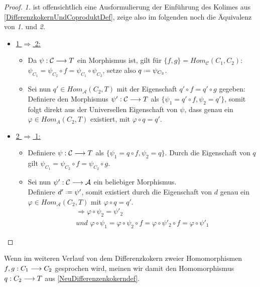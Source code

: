 \documentclass[10pt,a4paper]{report}
\newcommand{\functionfront}[3]{\nolinebreak{#1:#2 \longrightarrow #3}}
\newcommand*{\defeq}{\mathrel{\vcenter{\baselineskip0.5ex \lineskiplimit0pt
                     \hbox{\scriptsize.}\hbox{\scriptsize.}}}%
                     =}
\begin{document}
\begin{proof}
\textit{1.} ist offensichtlich eine Ausformulierung der Einführung des Kolimes aus \cref{DifferenzkokernUndCoproduktDef}, zeige also im folgenden noch die Äquivalenz von \textit{1.} und \textit{2.}
\begin{itemize}
\item \underline{1 $\Rightarrow$ 2:}
\begin{itemize}
\item[] Da $\functionfront{\psi}{\mathcal{C}}{T}$ ein Morphismus ist, gilt für $\lbrace f,g \rbrace = Hom_{\mathcal{C}}(C_1,C_2)$:\\ $\psi_{C_1} = \psi_{C_2} \circ f = \psi_{C_1} \circ \psi_{C_2}$, setze also 
 $q  \defeq \psi_{C_2}$.
\item[] Sei nun $q' \in Hom_{\mathcal{A}}(C_2,T)$ mit der Eigenschaft $q' \circ f = q' \circ g$ gegeben:\\
 Definiere den Morphismus $\functionfront{\psi '}{\mathcal{C}}{T}$ als $\lbrace \psi_1 = q' \circ f , \psi_2 = q' \rbrace$,  somit folgt direkt aus der Universellen Eigenschaft von $\psi$, dass genau ein $\varphi \in Hom_{A}(C_2,T)$ existiert, mit $ \varphi \circ q = q '$.
\end{itemize}
\item \underline{2 $\Rightarrow$ 1:}
\begin{itemize}
\item[] Definiere $\functionfront{\psi }{\mathcal{C}}{T}$ als $\lbrace \psi_1 = q \circ f , \psi_2 = q \rbrace$.
Durch die Eigenschaft von $q$ gilt $\psi_{C_1} = \psi_{C_2} \circ f = \psi_{C_2} \circ g$.
\item[] Sei nun $\functionfront{\psi '}{\mathcal{C}}{\mathcal{A}}$ ein beliebiger Morphismus.\\
Definiere $d' \defeq \psi '$, somit existiert durch die Eigenschaft von $d$ genau ein $\varphi \in Hom_{\mathcal{A}}(C_2,T)$ mit $\varphi \circ q = q'$.
\begin{gather*}
\Rightarrow \varphi \circ \psi_2 = \psi '_2 \\
\textit{und }\varphi \circ \psi_1 = \varphi \circ \psi_2 \circ f = \varphi \circ \psi '_2 \circ f = \varphi \circ \psi '_1
\end{gather*}
\end{itemize}
\end{itemize}
\end{proof}
Wenn im weiteren Verlauf von dem Differenzkokern zweier Homomorphismen $\functionfront{f,g}{C_1}{C_2}$ gesprochen wird, meinen wir damit den Homomorphismus $\functionfront{q}{C_2}{T}$ aus \cref{NeuDifferenzenkokerndef}.
\end{document}
